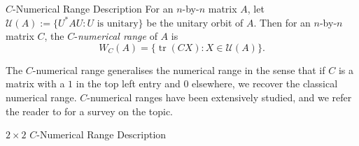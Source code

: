 \documentclass[12pt]{article}
\theoremstyle{plain}
\theoremstyle{definition}
\theoremstyle{remark}
\newcommand{\tr}{\operatorname{tr}}
\numberwithin{equation}{section}
\begin{document}
\begin{section}{$C$-Numerical Range Description}\label{3n}
For an $n$-by-$n$ matrix $A$, let $\mathcal{U}(A) := \{U^*AU :  U \text{ is unitary} \}$ be the unitary orbit of $A$. Then for an $n$-by-$n$ matrix $C$, the $C$-\textit{numerical range} of $A$ is 
$$
W_C(A) = \{\tr(CX) : X \in \mathcal{U}(A) \}.
$$

The $C$-numerical range generalises the numerical range in the sense that if $C$ is a matrix with a $1$ in the top left entry and 0 elsewhere, we recover the classical numerical range. $C$-numerical ranges have been extensively studied, and we refer the reader to \cite{li1994c} for a survey on the topic.





\begin{subsection}{$2 \times 2$ $C$-Numerical Range Description}\label{3.1}


\end{subsection}
\end{section}
\end{document}
